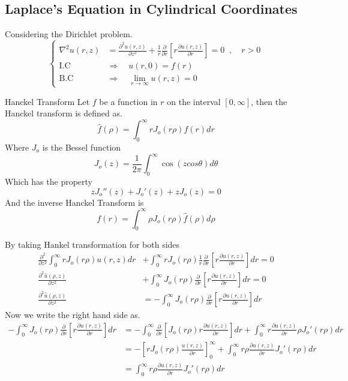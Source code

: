 \subsection{Laplace's Equation in Cylindrical Coordinates}
Considering the Dirichlet problem.
\[
    \begin{cases}
        \displaystyle \nabla^2 u(r,z) &= \frac{\partial^2 u(r,z)}{\partial z^2} + \frac{1}{r}\frac{\partial}{\partial r}\left[r\frac{\partial u(r,z)}{\partial r}\right] = 0 \;\; , \quad r >0
        \\
        \text{I.C} \quad &\Longrightarrow \quad u(r,0) = f(r)
        \\
        \text{B.C} \quad &\Longrightarrow \quad \lim_{r\rightarrow\infty} u(r,z) =0
    \end{cases}
\]
\begin{enrichment*}{Hanckel Transform}
    Let $f$ be a function in $r$ on the interval $[0,\infty]$, then the Hanckel transform is defined as.
    \[
        \hat{f}(\rho) = \int_{0}^{\infty} r J_o(r\rho) f(r) dr    
    \]
    Where $J_o$ is the Bessel function 
    \[
        J_o(z) = \frac{1}{2\pi}\int_{0}^{\infty} \cos(zcos\theta)d\theta     
    \]
    Which has the property 
    \[
        z J_o''(z) + J_o'(z)+ zJ_o(z) = 0     
    \]
    And the inverse Hanckel Transform is 
    \[
        f(r) = \int_{0}^{\infty} \rho J_o(r\rho) \hat{f}(\rho) d\rho    
    \]
\end{enrichment*}
By taking Hankel transformation for both sides
\begin{align*}
\frac{\partial^2 }{\partial z^2}\int_{0}^{\infty} rJ_o(r\rho)u(r,z) dr &+ \int_{0}^{\infty}rJ_o(r\rho)\frac{1}{r}\frac{\partial}{\partial r}\left[r\frac{\partial u(r,z)}{\partial r}\right]dr = 0
\\
\frac{\partial^2 \hat{u}(\rho,z)}{\partial z^2} &+ \int_{0}^{\infty}J_o(r\rho)\frac{\partial}{\partial r}\left[r\frac{\partial u(r,z)}{\partial r}\right]dr = 0
\\
\frac{\partial^2 \hat{u}(\rho,z)}{\partial z^2}  &= -\int_{0}^{\infty}J_o(r\rho)\frac{\partial}{\partial r}\left[r\frac{\partial u(r,z)}{\partial r}\right]dr    
\end{align*}
Now we write the right hand side as.
\begin{align*}
-\int_{0}^{\infty}J_o(r\rho)\frac{\partial}{\partial r}\left[r\frac{\partial u(r,z)}{\partial r}\right]dr &= -\int_{0}^{\infty}\frac{\partial}{\partial r}\left[J_o(r\rho)r\frac{\partial u(r,z)}{\partial r}\right]dr + \int_{0}^{\infty} r\frac{\partial u(r,z)}{\partial r} \rho J_o'(r\rho)dr
\\
&= -\left[rJ_o(r\rho)\frac{u(r,z)}{\partial r}\right]_{0}^{\infty} + \int_{0}^{\infty} r\rho\frac{\partial u(r,z)}{\partial r} J_o'(r\rho)dr
\\
&= \int_{0}^{\infty} r\rho\frac{\partial u(r,z)}{\partial r} J_o'(r\rho)dr
\end{align*}

